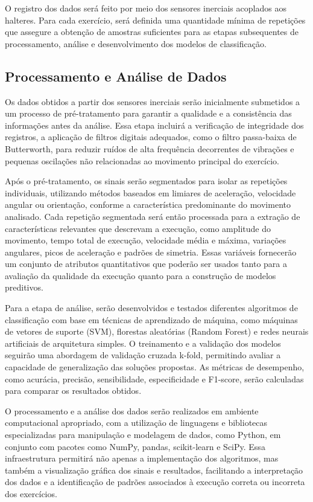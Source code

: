 O registro dos dados será feito por meio dos sensores inerciais acoplados aos halteres. Para cada exercício, será definida uma quantidade mínima de repetições que assegure a obtenção de amostras suficientes para as etapas subsequentes de processamento, análise e desenvolvimento dos modelos de classificação.


\subsection{Processamento e Análise de Dados}

Os dados obtidos a partir dos sensores inerciais serão inicialmente submetidos a um processo de pré-tratamento para garantir a qualidade e a consistência das informações antes da análise. Essa etapa incluirá a verificação de integridade dos registros, a aplicação de filtros digitais adequados, como o filtro passa-baixa de Butterworth, para reduzir ruídos de alta frequência decorrentes de vibrações e pequenas oscilações não relacionadas ao movimento principal do exercício.

Após o pré-tratamento, os sinais serão segmentados para isolar as repetições individuais, utilizando métodos baseados em limiares de aceleração, velocidade angular ou orientação, conforme a característica predominante do movimento analisado. Cada repetição segmentada será então processada para a extração de características relevantes que descrevam a execução, como amplitude do movimento, tempo total de execução, velocidade média e máxima, variações angulares, picos de aceleração e padrões de simetria. Essas variáveis fornecerão um conjunto de atributos quantitativos que poderão ser usados tanto para a avaliação da qualidade da execução quanto para a construção de modelos preditivos.

Para a etapa de análise, serão desenvolvidos e testados diferentes algoritmos de classificação com base em técnicas de aprendizado de máquina, como máquinas de vetores de suporte (SVM), florestas aleatórias (Random Forest) e redes neurais artificiais de arquitetura simples. O treinamento e a validação dos modelos seguirão uma abordagem de validação cruzada k-fold, permitindo avaliar a capacidade de generalização das soluções propostas. As métricas de desempenho, como acurácia, precisão, sensibilidade, especificidade e F1-score, serão calculadas para comparar os resultados obtidos.

O processamento e a análise dos dados serão realizados em ambiente computacional apropriado, com a utilização de linguagens e bibliotecas especializadas para manipulação e modelagem de dados, como Python, em conjunto com pacotes como NumPy, pandas, scikit-learn e SciPy. Essa infraestrutura permitirá não apenas a implementação dos algoritmos, mas também a visualização gráfica dos sinais e resultados, facilitando a interpretação dos dados e a identificação de padrões associados à execução correta ou incorreta dos exercícios.

